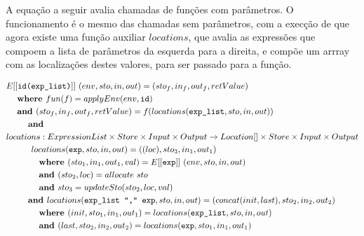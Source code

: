 \documentclass[12pt]{article}
\newcommand\eb[1]{[[\texttt{#1}]]}
\begin{document}
A equação a seguir avalia chamadas de funções com parâmetros. O funcionamento é o mesmo das chamadas sem parâmetros, com a execção de que agora existe uma função auxiliar $locations$, que avalia as expressões que compoem a lista de parâmetros da esquerda para a direita, e compõe um arrray com as localizações destes valores, para ser passado para a função.

\begin{align*}
&E\eb{id(exp\_list)}\ (env,sto,in,out) = (sto_f, in_f, out_f, retValue) \\
&\hspace{3ex}\textbf{where }fun(f) = applyEnv(env, \texttt{id}) \\
&\hspace{3ex}\textbf{and }(sto_f, in_f, out_f, retValue) = f(locations(\texttt{exp\_list},sto,in,out)) \\
&\hspace{6ex} \textbf{and } \\
&locations:ExpressionList\times Store \times Input \times Output \to Location[] \times Store \times Input \times Output \\
&\hspace{6ex} \textbf{      } locations(\texttt{exp},sto,in,out) = ((loc), sto_3, in_1, out_1) \\
&\hspace{9ex} \textbf{where } (sto_1, in_1, out_1, val) = E\eb{exp}\ (env, sto, in, out)\\
&\hspace{9ex} \textbf{and } (sto_2, loc) = allocate\ sto \\
&\hspace{9ex} \textbf{and } sto_3 = updateSto(sto_2, loc, val) \\
&\hspace{6ex} \textbf{and } locations(\texttt{exp\_list "," exp},sto,in,out) = (concat(init, last), sto_2,in_2,out_2) \\
&\hspace{9ex} \textbf{where } (init,sto_1,in_1,out_1) = locations(\texttt{exp\_list}, sto,in,out) \\
&\hspace{9ex} \textbf{and } (last,sto_2,in_2,out_2) = locations(\texttt{exp},sto_1,in_1,out_1) \\
\end{align*}
\end{document}
